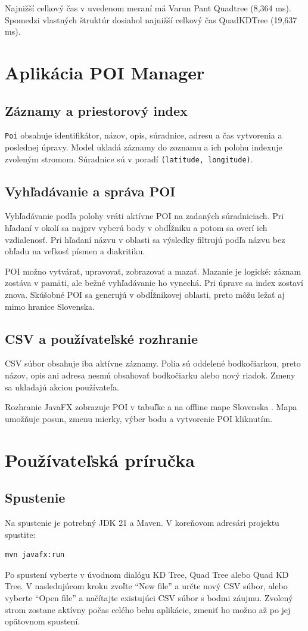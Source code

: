 \documentclass[12pt,a4paper,oneside]{report}
\begin{document}
Najnižší celkový čas v uvedenom meraní má Varun Pant Quadtree
(8,364 ms). Spomedzi vlastných štruktúr dosiahol najnižší celkový čas
QuadKDTree (19,637 ms).

\chapter{Aplikácia POI Manager}
\label{chap:poi}

\section{Záznamy a priestorový index}
\texttt{Poi} obsahuje identifikátor, názov, opis, súradnice, adresu
a čas vytvorenia a poslednej úpravy. Model ukladá záznamy do zoznamu
a ich polohu indexuje zvoleným stromom. Súradnice sú v poradí
\texttt{(latitude, longitude)}.

\section{Vyhľadávanie a správa POI}
Vyhľadávanie podľa polohy vráti aktívne POI na zadaných súradniciach.
Pri hľadaní v okolí sa najprv vyberú body v obdĺžniku a potom sa overí
ich vzdialenosť. Pri hľadaní názvu v oblasti sa výsledky filtrujú podľa
názvu bez ohľadu na veľkosť písmen a diakritiku.

POI možno vytvárať, upravovať, zobrazovať a mazať. Mazanie je logické:
záznam zostáva v pamäti, ale bežné vyhľadávanie ho vynechá. Pri úprave
sa index zostaví znova. Skúšobné POI sa generujú v obdĺžnikovej oblasti,
preto môžu ležať aj mimo hranice Slovenska.

\section{CSV a používateľské rozhranie}
CSV súbor obsahuje iba aktívne záznamy. Polia sú oddelené bodkočiarkou,
preto názov, opis ani adresa nesmú obsahovať bodkočiarku alebo nový riadok.
Zmeny sa ukladajú akciou používateľa.

Rozhranie JavaFX zobrazuje POI v tabuľke a na offline mape Slovenska
\cite{naturalEarth}. Mapa umožňuje posun, zmenu mierky, výber bodu
a vytvorenie POI kliknutím.

\chapter{Používateľská príručka}

\section{Spustenie}
Na spustenie je potrebný JDK 21 a Maven. V koreňovom adresári projektu
spustite:
\begin{verbatim}
mvn javafx:run
\end{verbatim}
Po spustení vyberte v úvodnom dialógu KD Tree, Quad Tree alebo Quad KD
Tree. V nasledujúcom kroku zvoľte \enquote{New file} a určte nový CSV
súbor, alebo vyberte \enquote{Open file} a načítajte existujúci CSV
súbor s bodmi záujmu. Zvolený strom zostane aktívny počas celého behu aplikácie,
zmeniť ho možno až po jej opätovnom spustení.
\end{document}
